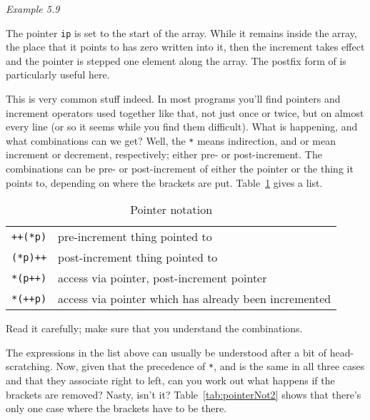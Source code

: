     \begin{center}\textit{Example 5.9}\end{center}


   The pointer \texttt{ip} is set to the start of the array. While it
    remains inside the array, the place that it points to has zero written
    into it, then the increment takes effect and the pointer is stepped one
    element along the array. The postfix form of \pp{} is
    particularly useful here.


   This is very common stuff indeed. In most programs you'll find
    pointers and increment operators used together like that, not just once
    or twice, but on almost every line (or so it seems while you find them
    difficult). What is happening, and what combinations can we get? Well,
    the \texttt{*} means indirection, and \pp{} or
    \mm{} mean increment or decrement, respectively;
    either pre- or post-increment.
    The combinations can be pre- or post-increment
    of either the pointer or the thing it points to,
    depending on where the brackets are put.
    Table~\ref{tab:pointerNot} gives a list.


    \begin{table}[htb]
      \centering
      \begin{tabular}{ll}
        \toprule
        \texttt{++(*p)} & pre-increment thing pointed to    \\
        \texttt{(*p)++} & post-increment thing pointed to    \\
        \texttt{*(p++)} & access via pointer, post-increment pointer    \\
        \texttt{*(++p)} & access via pointer which has already been incremented \\
        \bottomrule
      \end{tabular}
      \caption{\label{tab:pointerNot}Pointer notation}
    \end{table}



   Read it carefully; make sure that you understand the combinations.


   The expressions in the list above can usually be understood after
    a bit of head-scratching. Now, given that the precedence of
    \texttt{*}, \pp{} and \mm{} is the same in all
    three cases and that they associate right to left, can you work out what
    happens if the brackets are removed?
    Nasty, isn't it?
    Table~\ref{tab:pointerNot2} shows that there's only one case where the brackets have to
    be there.


